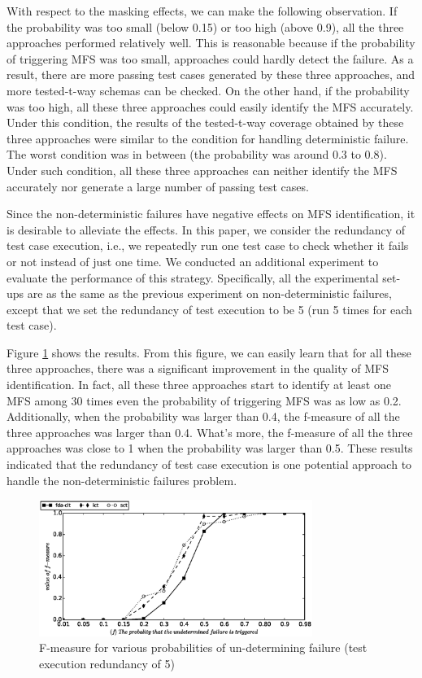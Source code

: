 \documentclass[journal,12pt,onecolumn,draftclsnofoot,]{IEEEtran}
\begin{document}
With respect to the masking effects, we can make the following observation.
If the probability was too small (below 0.15) or too high (above 0.9), all the three approaches performed
relatively well. This is reasonable because if the probability of triggering MFS was too small, approaches could hardly
detect the failure. As a result, there are more passing test cases generated by these three approaches, and more tested-t-way schemas can be checked. On the other hand, if the probability was too high, all these three approaches could easily identify the MFS accurately. Under this condition, the results of the tested-t-way coverage obtained by these three approaches were similar to the condition for handling
deterministic failure. The worst condition was in between (the probability was around 0.3 to 0.8). Under such condition, all these three approaches can neither identify the MFS accurately nor generate a large number of passing test cases.

Since the non-deterministic failures have negative effects on MFS identification, it is desirable to alleviate the effects. In this paper, we consider the redundancy of test case execution, i.e., we repeatedly run one test case to check whether it fails or not instead of just one time. We conducted an additional experiment to evaluate the performance of this strategy. Specifically, all the experimental set-ups are as the same as the previous experiment on non-deterministic failures, except that we set the redundancy of test execution to be 5 (run 5 times for each test case).

Figure \ref{sen_und_f_measure_result_reduncy} shows the results. From this figure, we can easily learn that for all these three approaches, there was a significant improvement in the quality of MFS identification. In fact, all these three approaches start to identify at least one MFS among 30 times even the probability of triggering MFS was as low as 0.2. Additionally, when the probability was larger than 0.4, the f-measure of all the three approaches was larger than 0.4. What's more, the f-measure of all the three approaches was close to 1 when  the probability was larger than 0.5.  These results indicated that the redundancy of test case execution is one potential approach to handle the non-deterministic failures problem.
\begin{figure}[htbp]
 \includegraphics[width=3.5in]{sen_und_redundancy.eps}
\caption{F-measure for various probabilities of un-determining failure (test execution redundancy of 5)}
\label{sen_und_f_measure_result_reduncy}
\end{figure}
\end{document}
